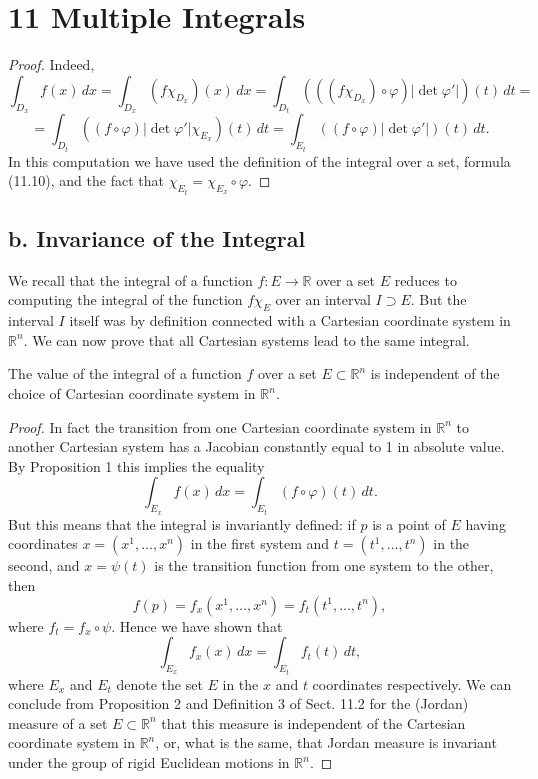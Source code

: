 \documentclass{article}
\begin{document}
\section*{11 Multiple Integrals}

\begin{proof}
Indeed,
\[
\int_{D_x} f(x)\,dx = \int_{D_x} (f \chi_{D_x})(x)\,dx = \int_{D_t} (((f \chi_{D_x}) \circ \varphi) |\det \varphi'|) (t)\,dt =
\]
\[
= \int_{D_t} ((f \circ \varphi)|\det \varphi'| \chi_{E_x}) (t)\,dt = \int_{E_t} ((f \circ \varphi)|\det \varphi'|) (t)\,dt.
\]
In this computation we have used the definition of the integral over a set, formula
(11.10), and the fact that $\chi_{E_t} = \chi_{E_x} \circ \varphi$.
\end{proof}

\subsection*{b. Invariance of the Integral}
We recall that the integral of a function $f : E \to \mathbb{R}$ over a set $E$ reduces to computing the integral of the function $f \chi_E$ over an interval $I \supset E$. But the interval $I$ itself
was by definition connected with a Cartesian coordinate system in $\mathbb{R}^n$. We can now
prove that all Cartesian systems lead to the same integral.

\begin{proposition}
The value of the integral of a function $f$ over a set $E \subset \mathbb{R}^n$ is independent of the choice of Cartesian coordinate system in $\mathbb{R}^n$.
\end{proposition}

\begin{proof}
In fact the transition from one Cartesian coordinate system in $\mathbb{R}^n$ to another
Cartesian system has a Jacobian constantly equal to 1 in absolute value. By Proposition 1 this implies the equality
\[
\int_{E_x} f(x)\,dx = \int_{E_t} (f \circ \varphi)(t)\,dt.
\]
But this means that the integral is invariantly defined: if $p$ is a point of $E$ having
coordinates $x = (x^1, \ldots, x^n)$ in the first system and $t = (t^1, \ldots, t^n)$ in the second,
and $x = \psi(t)$ is the transition function from one system to the other, then
\[
f(p) = f_x(x^1,\ldots,x^n) = f_t(t^1,\ldots,t^n),
\]
where $f_t = f_x \circ \psi$. Hence we have shown that
\[
\int_{E_x} f_x(x)\,dx = \int_{E_t} f_t(t)\,dt,
\]
where $E_x$ and $E_t$ denote the set $E$ in the $x$ and $t$ coordinates respectively.
We can conclude from Proposition 2 and Definition 3 of Sect. 11.2 for the (Jordan) measure of a set $E \subset \mathbb{R}^n$ that this measure is independent of the Cartesian
coordinate system in $\mathbb{R}^n$, or, what is the same, that Jordan measure is invariant under the group of rigid Euclidean motions in $\mathbb{R}^n$.
\end{proof}
\end{document}

